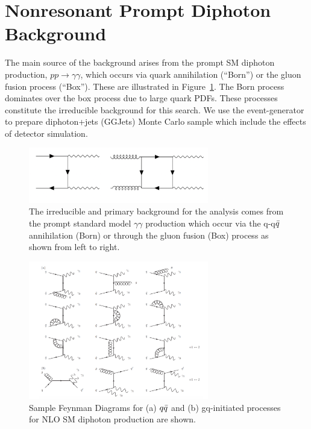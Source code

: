 \section{Nonresonant Prompt Diphoton Background}\label{sec:bkg_real}
The main source of the background arises from the prompt SM diphoton production, $pp\longrightarrow \gamma\gamma$, which occurs via quark annihilation (``Born'') or the gluon fusion process (``Box''). These are illustrated in Figure~\ref{fig:LOFeynmanBackgroundDiphoton}. The Born process dominates over the box process due to large quark PDFs. These processes constitute the irreducible background for this search. We use the \SHERPA event-generator to prepare diphoton+jets (GGJets) Monte Carlo sample which include the effects of detector simulation. 

\begin{figure}[tbp!]
\begin{center}
\includegraphics[angle=0,width=0.7\textwidth]{fig/PromptDiphotonBackground.png}
\end{center}
\caption{The irreducible and primary background for the analysis comes from the prompt standard model $\gamma\gamma$ production which occur via the q-q$\Bar{q}$ annihilation (Born) or through the gluon fusion (Box)  process as shown from left to right.}
\label{fig:LOFeynmanBackgroundDiphoton}
\end{figure}


\begin{figure}[tbp!]
\begin{center}
\includegraphics[angle=0,width=0.7\textwidth]{fig/FeynmanDiagramsNLO.png}
\end{center}
\caption{Sample Feynman Diagrams for (a) $q\Bar{q}$ and (b) gq-initiated processes for NLO SM diphoton production are shown. \cite{DErrico:2011cgc}}
\label{fig:NLOSMBackground}
\end{figure}

